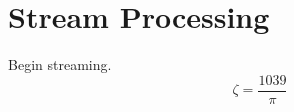 \begin{savequote}[75mm]
\end{savequote}

\chapter{Stream Processing}

\newthought{}
Begin streaming.
$$\zeta = \frac{1039}{\pi}$$

